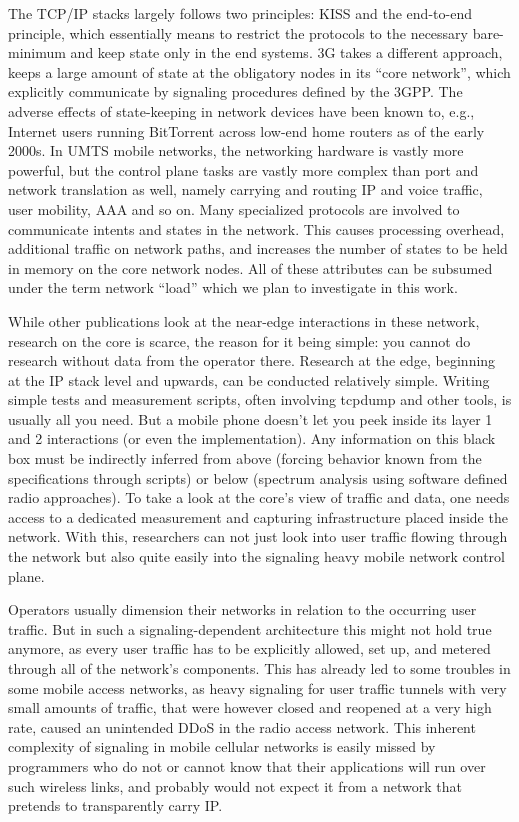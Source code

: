 The TCP/IP stacks largely follows two principles: \ac{KISS} and the end-to-end principle\cite{saltzer1984end2end}, which essentially means to restrict the protocols to the necessary bare-minimum and keep state only in the end systems. 3G takes a different approach, keeps a large amount of state at the obligatory nodes in its ``core network'', which explicitly communicate by signaling procedures defined by the \ac{3GPP}.
The adverse effects of state-keeping in network devices have been known to, e.g.,  Internet users running BitTorrent across low-end home routers as of the early 2000s. In \ac{UMTS} mobile networks, the networking hardware is vastly more powerful, but the control plane tasks are vastly more complex than port and network translation as well, namely carrying and routing IP and voice traffic, user mobility, \ac{AAA} and so on. Many specialized protocols are involved to communicate intents and states in the network. This causes processing overhead, additional traffic on network paths, and increases the number of states to be held in memory on the core network nodes. All of these attributes can be subsumed under the term network ``load'' which we plan to investigate in this work.

While other publications look at the near-edge interactions in these network, research on the core is scarce, the reason for it being simple: you cannot do research without data from the operator there. Research at the edge, beginning at the IP stack level and upwards, can be conducted relatively simple. Writing simple tests and measurement scripts, often involving tcpdump and other tools, is usually all you need. But a mobile phone doesn't let you peek inside its layer 1 and 2 interactions (or even the implementation). Any information on this black box must be indirectly inferred from above (forcing behavior known from the specifications through scripts) or below (spectrum analysis using software defined radio approaches). To take a look at the core's view of traffic and data, one needs access to a dedicated measurement and capturing infrastructure placed inside the network. With this, researchers can not just look into user traffic flowing through the network but also quite easily into the signaling heavy mobile network control plane. 

Operators usually dimension their networks in relation to the occurring user traffic. But in such a signaling-dependent architecture this might not hold true anymore, as every user traffic has to be explicitly allowed, set up, and metered through all of the network's components. This has already led to some troubles in some mobile access networks, as heavy signaling for user traffic tunnels with very small amounts of traffic, that were however closed and reopened at a very high rate, caused an unintended \ac{DDoS} in the radio access network\cite{lt2012docostorm, it2011birdandroid}. 
This inherent complexity of signaling in mobile cellular networks is easily missed by programmers who do not or cannot know that their applications will run over such wireless links, and probably would not expect it from a network that pretends to transparently carry IP.

